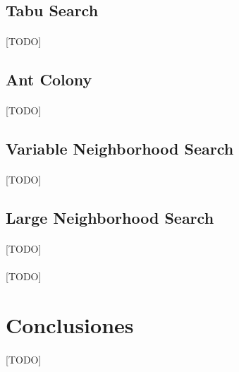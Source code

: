 \documentclass{subfiles}
\begin{document}
      \subsection{Tabu Search}
      \label{sec:solving_tabu}

        \paragraph{}
        [TODO]

      \subsection{Ant Colony}
      \label{sec:solving_ant_colony}

        \paragraph{}
        [TODO]

      \subsection{Variable Neighborhood Search}
      \label{sec:solving_vns}

        \paragraph{}
        [TODO]

      \subsection{Large Neighborhood Search}
      \label{sec:solving_lns}

        \paragraph{}
        [TODO]

      \paragraph{}
      [TODO]

    \section{Conclusiones}
    \label{sec:solving_conclusions}

      \paragraph{}
      [TODO]
\end{document}
